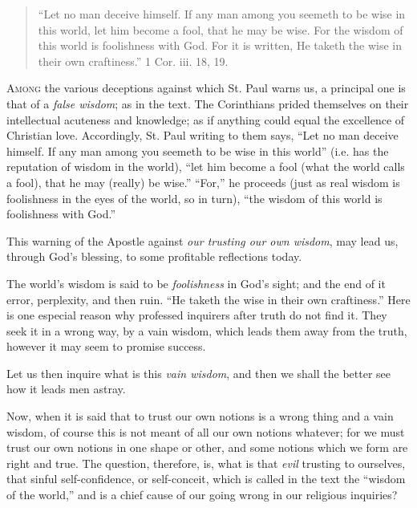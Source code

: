 
\begin{quote}

``Let no man deceive himself. If any man among
you seemeth to be wise in this world, let him become
a fool, that he may be wise. For the wisdom of this
world is foolishness with God. For it is written, He
taketh the wise in their own craftiness.'' 1 Cor.
iii. 18, 19.

\end{quote}

A\textsc{mong} the various deceptions against which St. Paul
warns us, a principal one is that of a \emph{false wisdom};
as in the text. The Corinthians prided themselves on
their intellectual acuteness and knowledge; as if
anything could equal the excellence of Christian love.
Accordingly, St. Paul writing to them says, ``Let no
man deceive himself. If any man among you seemeth to be
wise in this world'' (i.e. has the reputation of
wisdom in the world), ``let him become a fool (what
the world calls a fool), that he may (really) be
wise.'' ``For,'' he proceeds (just as real
wisdom is foolishness in the eyes of the world, so in
turn), ``the wisdom of this world is foolishness with
God.''

This warning of the Apostle against \emph{our trusting
our own wisdom}, may lead us, through God's blessing,
to some profitable reflections today.

The world's wisdom is said to be \emph{foolishness}
in God's sight; and the end of it error, perplexity, and
then ruin. ``He taketh the wise in their own
craftiness.'' Here is one especial reason why
professed inquirers after truth do not find it. They seek
it in a wrong way, by a vain wisdom, which leads them
away from the truth, however it may seem to promise
success.

Let us then inquire what is this \emph{vain wisdom},
and then we shall the better see how it leads men astray.

Now, when it is said that to trust our own notions is
a wrong thing and a vain wisdom, of course this is not
meant of all our own notions whatever; for we must trust
our own notions in one shape or other, and some notions
which we form are right and true. The question,
therefore, is, what is that \emph{evil} trusting to
ourselves, that sinful self-confidence, or self-conceit,
which is called in the text the ``wisdom of the
world,'' and is a chief cause of our going wrong in
our religious inquiries?

